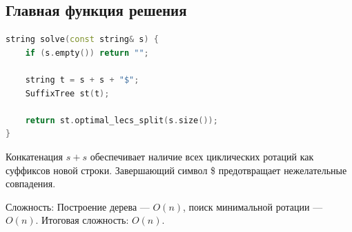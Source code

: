 \subsection{Главная функция решения}

\begin{lstlisting}[language=C++]
string solve(const string& s) {
    if (s.empty()) return "";

    string t = s + s + "$";
    SuffixTree st(t);

    return st.optimal_lecs_split(s.size());
}
\end{lstlisting}

Конкатенация $s + s$ обеспечивает наличие всех циклических ротаций как суффиксов новой строки. Завершающий символ \$ предотвращает нежелательные совпадения.

Сложность: Построение дерева --- $O(n)$, поиск минимальной ротации --- $O(n)$. Итоговая сложность: $O(n)$.

\pagebreak
